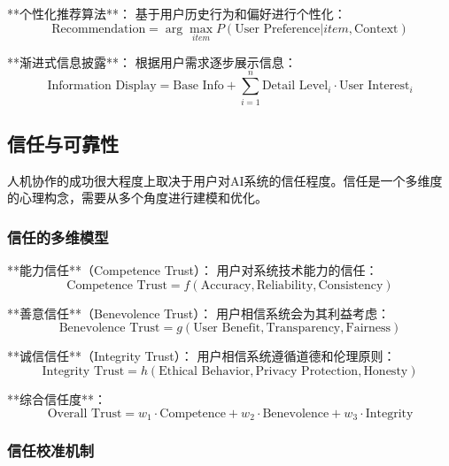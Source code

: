 **个性化推荐算法**：
基于用户历史行为和偏好进行个性化：
\begin{equation}
\text{Recommendation} = \arg\max_{item} P(\text{User Preference}|item, \text{Context})
\end{equation}

**渐进式信息披露**：
根据用户需求逐步展示信息：
\begin{equation}
\text{Information Display} = \text{Base Info} + \sum_{i=1}^n \text{Detail Level}_i \cdot \text{User Interest}_i
\end{equation}

\subsection{信任与可靠性}

人机协作的成功很大程度上取决于用户对AI系统的信任程度。信任是一个多维度的心理构念，需要从多个角度进行建模和优化。

\subsubsection{信任的多维模型} %

**能力信任**（Competence Trust）：
用户对系统技术能力的信任：
\begin{equation}
\text{Competence Trust} = f(\text{Accuracy}, \text{Reliability}, \text{Consistency})
\end{equation}

**善意信任**（Benevolence Trust）：
用户相信系统会为其利益考虑：
\begin{equation}
\text{Benevolence Trust} = g(\text{User Benefit}, \text{Transparency}, \text{Fairness})
\end{equation}

**诚信信任**（Integrity Trust）：
用户相信系统遵循道德和伦理原则：
\begin{equation}
\text{Integrity Trust} = h(\text{Ethical Behavior}, \text{Privacy Protection}, \text{Honesty})
\end{equation}

**综合信任度**：
\begin{equation}
\text{Overall Trust} = w_1 \cdot \text{Competence} + w_2 \cdot \text{Benevolence} + w_3 \cdot \text{Integrity}
\end{equation}

\subsubsection{信任校准机制} %

